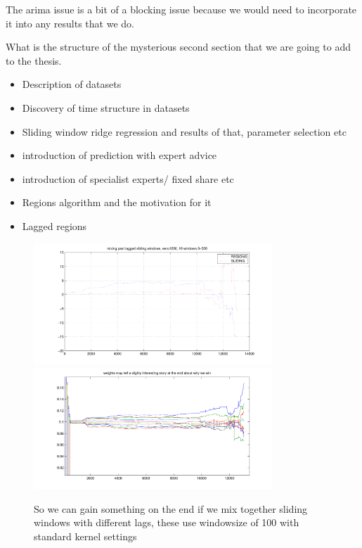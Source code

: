 \documentclass[envcountsame]{llncs}
\begin{document}
The arima issue is a bit of a blocking issue because we would need to incorporate it into any results that we do.

What is the structure of the mysterious second section that we are going to add to the thesis. 

\begin{itemize} 
\item Description of datasets
\item Discovery of time structure in datasets
\item Sliding window ridge regression and results of that, parameter selection etc
\item introduction of prediction with expert advice
\item introduction of specialist experts/ fixed share etc
\item Regions algorithm and the motivation for it
\item Lagged regions
\end{itemize}


\begin{figure}
\centering
\includegraphics[width=0.8\textwidth]{images/mixed_sliding}
\includegraphics[width=0.8\textwidth]{images/mixed_sliding_weights}

\caption{So we can gain something on the end if we mix together sliding windows with different lags, these use windowsize of 100 with standard kernel settings}
\label{fig:mixsliding}
\end{figure}








\end{document}
